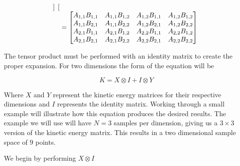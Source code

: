 \documentclass[authoryearcitations]{UoYCSproject}
\begin{document}
\begin{equation}
\begin{array}{r l}
\begin{bmatrix}
                \end{bmatrix} \\
              & = \begin{bmatrix}
                    A_{1,1}B_{1,1} & A_{1,1}B_{1,2} & A_{1,2}B_{1,1} & A_{1,2}B_{1,2} \\
                    A_{1,1}B_{2,1} & A_{1,1}B_{2,2} & A_{1,2}B_{2,1} & A_{1,2}B_{2,2} \\
                    A_{2,1}B_{1,1} & A_{2,1}B_{1,2} & A_{2,2}B_{1,1} & A_{2,2}B_{1,2} \\
                    A_{2,1}B_{2,1} & A_{2,1}B_{2,2} & A_{2,2}B_{2,1} & A_{2,2}B_{2,2} \\
                   \end{bmatrix}
\end{array}
\label{eq:tensorDef}
\end{equation}

The tensor product must be performed with an identity matrix to create the proper expansion. For two dimensions
the form of the equation will be 

\begin{equation}
K = X \otimes I + I \otimes Y
\label{eq:2DTensor}
\end{equation}

Where $X$ and $Y$ represent the kinetic energy matrices for their respective dimensions and $I$ represents the 
identity matrix. Working through a small example will illustrate how this equation produces the desired results. 
The example we will use will have $N = 3$ samples per dimension, giving us a $3 \times 3$ version of the kinetic
energy matrix. This results in a two dimensional sample space of $9$ points. 

We begin by performing $X \otimes I$
\end{document}

